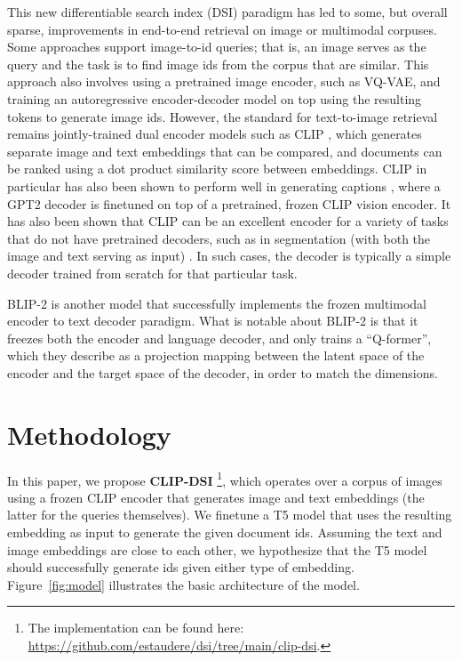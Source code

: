 \documentclass[11pt,a4paper]{article}
\begin{document}
This new differentiable search index (DSI) paradigm has led to some, but overall sparse, improvements in end-to-end retrieval on image or multimodal corpuses. Some approaches \citep{zhang2023} support image-to-id queries; that is, an image serves as the query and the task is to find image ids from the corpus that are similar. This approach also involves using a pretrained image encoder, such as VQ-VAE, and training an autoregressive encoder-decoder model on top using the resulting tokens to generate image ids. However, the standard for text-to-image retrieval remains jointly-trained dual encoder models such as CLIP \citep{radford2021}, which generates separate image and text embeddings that can be compared, and documents can be ranked using a dot product similarity score between embeddings. CLIP in particular has also been shown to perform well in generating captions \citep{mokady2021}, where a GPT2 decoder \citep{brown2020} is finetuned on top of a pretrained, frozen CLIP vision encoder. It has also been shown that CLIP can be an excellent encoder for a variety of tasks that do not have pretrained decoders, such as in segmentation (with both the image and text serving as input) \citep{lüddecke2022}. In such cases, the decoder is typically a simple decoder trained from scratch for that particular task.

BLIP-2 \citep{li2023} is another model that successfully implements the frozen multimodal encoder to text decoder paradigm. What is notable about BLIP-2 is that it freezes both the encoder and language decoder, and only trains a ``Q-former'', which they describe as a projection mapping between the latent space of the encoder and the target space of the decoder, in order to match the dimensions.

\section*{Methodology}

In this paper, we propose \textbf{CLIP-DSI} \footnote{The implementation can be found here: \url{https://github.com/estaudere/dsi/tree/main/clip-dsi}.}, which operates over a corpus of images using a frozen CLIP encoder that generates image and text embeddings (the latter for the queries themselves). We finetune a T5 model \citep{raffel2019} that uses the resulting embedding as input to generate the given document ids. Assuming the text and image embeddings are close to each other, we hypothesize that the T5 model should successfully generate ids given either type of embedding. Figure~\ref{fig:model} illustrates the basic architecture of the model.
 
\end{document}
